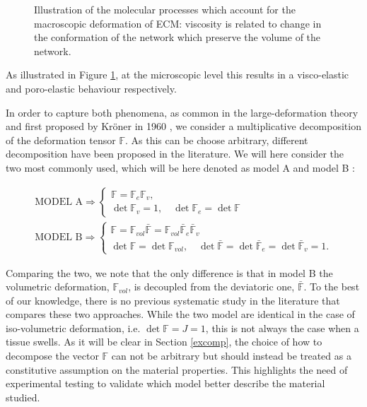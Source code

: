 \documentclass[runningheads]{llncs}
\newcommand{\F}{\ensuremath{\mathbb{F}}}
\begin{document}
\begin{figure}[h!]
	\hspace{-12mm}
	\def\svgwidth{1.2\linewidth}
	
	\caption{Illustration of the molecular processes which account for the macroscopic deformation of ECM: viscosity is related to change in the conformation of the network which preserve the volume of the network.}
	\label{deformation}
\end{figure}
As illustrated in Figure \ref{deformation}, at the microscopic level this results in a visco-elastic and poro-elastic behaviour respectively.

In order to capture both phenomena, as common in the large-deformation theory \cite{Article1,CACCAVO2,Plasto,magneto,NGUYEN,growthtum} and first proposed by Kr\"{o}ner in 1960 \cite{kro}, we consider a multiplicative decomposition of the deformation tensor $\F$. As this can be choose arbitrary, different decomposition have been proposed in the literature. We will here consider the two most commonly used, which will be here denoted as model A \cite{Article1,CACCAVO2,Plasto} and model B \cite{magneto,NGUYEN,Jeru}:

\begin{gather}
\text{MODEL A} \Rightarrow\begin{cases}
\F=\F_e\F_v,\\
\det\F_v=1, \quad \det\F_e=\det\F
\end{cases} \label{dec1}\tag{A}\\[4pt]
\text{MODEL B} \Rightarrow\begin{cases}
\F= \F_{vol}\bar{\F}=\F_{vol}\bar{\F}_e\bar{\F}_v\\
\det\F=\det\F_{vol},\quad \det\bar{\F}=\det\bar{\F}_e=\det\bar{\F}_v=1.\label{dec2}
\end{cases}\tag{B}
\end{gather}

Comparing the two, we note that the only difference is that in model B the volumetric deformation, $\F_{vol}$, is decoupled from the deviatoric one, $\bar{\F}$.
To the best of our knowledge, there is no previous systematic study in the literature that compares these two approaches. While the two model are identical in the case of iso-volumetric deformation, i.e. $\det \F=J=1$, this is not always the case when a tissue swells. As it will be clear in Section \ref{excomp}, the choice of how to decompose the vector $\F$ can not be arbitrary but should instead be treated as a constitutive assumption on the material properties. This highlights the need of experimental testing to validate which model better describe the material studied.
\end{document}

